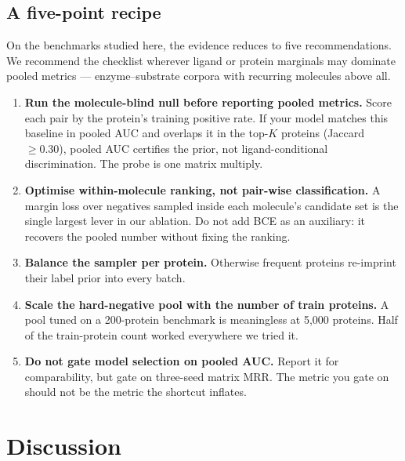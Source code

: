 \documentclass[11pt,a4paper]{article}
\newcommand{\mrr}{matrix MRR}
\begin{document}
\subsection{A five-point recipe}
\label{sec:recipe}

On the benchmarks studied here, the evidence reduces to five
recommendations. We recommend the checklist wherever ligand or protein
marginals may dominate pooled metrics --- enzyme--substrate corpora with
recurring molecules above all.

\begin{enumerate}[leftmargin=*,itemsep=2pt,topsep=2pt]
  \item \textbf{Run the molecule-blind null before reporting pooled
        metrics.} Score each pair by the protein's training positive rate.
        If your model matches this baseline in pooled AUC and overlaps it
        in the top-$K$ proteins (Jaccard $\geq 0.30$), pooled AUC certifies
        the prior, not ligand-conditional discrimination. The probe is one
        matrix multiply.
  \item \textbf{Optimise within-molecule ranking, not pair-wise
        classification.} A margin loss over negatives sampled inside each
        molecule's candidate set is the single largest lever in our
        ablation. Do not add BCE as an auxiliary: it recovers the pooled
        number without fixing the ranking.
  \item \textbf{Balance the sampler per protein.} Otherwise frequent
        proteins re-imprint their label prior into every batch.
  \item \textbf{Scale the hard-negative pool with the number of train
        proteins.} A pool tuned on a 200-protein benchmark is meaningless
        at 5{,}000 proteins. Half of the train-protein count worked
        everywhere we tried it.
  \item \textbf{Do not gate model selection on pooled AUC.} Report it for
        comparability, but gate on three-seed \mrr{}. The metric you gate
        on should not be the metric the shortcut inflates.
\end{enumerate}

\section{Discussion}
\label{sec:discussion}
\end{document}

